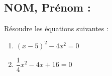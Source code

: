 \documentclass[a4paper,11pt,exos]{nsi}
\begin{document}
\subsection*{NOM, Prénom : \dotfill} 


\maketitle




\begin{exercice}
    Résoudre les équations suivantes :
    \begin{multicols}{2}
        \begin{enumerate}
            \item $(x-5)^2-4x^2=0$
	        \item $\dfrac{1}{4}x^2-4x+16=0$
        \end{enumerate}
    \end{multicols}
    
\end{exercice}

\end{document}
